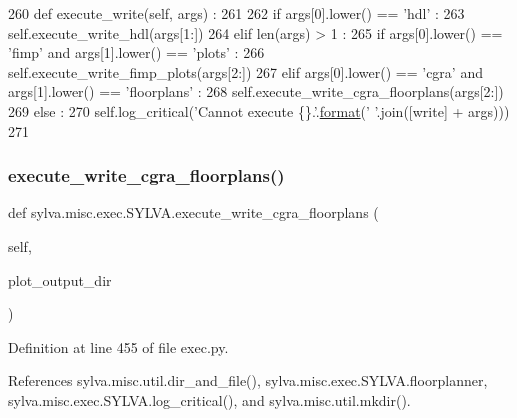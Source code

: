 \begin{DoxyCode}
260   \textcolor{keyword}{def }execute\_write(self, args) :
261 
262     \textcolor{keywordflow}{if} args[0].lower() == \textcolor{stringliteral}{'hdl'} :
263       self.execute\_write\_hdl(args[1:])
264     \textcolor{keywordflow}{elif} len(args) > 1 :
265       \textcolor{keywordflow}{if} args[0].lower() == \textcolor{stringliteral}{'fimp'} \textcolor{keywordflow}{and} args[1].lower() == \textcolor{stringliteral}{'plots'} :
266         self.execute\_write\_fimp\_plots(args[2:])
267       \textcolor{keywordflow}{elif} args[0].lower() == \textcolor{stringliteral}{'cgra'} \textcolor{keywordflow}{and} args[1].lower() == \textcolor{stringliteral}{'floorplans'} :
268         self.execute\_write\_cgra\_floorplans(args[2:])
269     \textcolor{keywordflow}{else} :
270       self.log\_critical(\textcolor{stringliteral}{'Cannot execute \{\}.'}.\hyperlink{namespacesylva_1_1examples_1_1hsdfg_ab3510a0b8457362330aa4d9fd2209590}{format}(\textcolor{stringliteral}{' '}.join([write] + args)))
271 
\end{DoxyCode}
\mbox{\label{classsylva_1_1misc_1_1exec_1_1_s_y_l_v_a_a7de1c85d07263c80c435c01ca33f6f18}} 
\subsubsection{\texorpdfstring{execute\+\_\+write\+\_\+cgra\+\_\+floorplans()}{execute\_write\_cgra\_floorplans()}}
{\footnotesize\ttfamily def sylva.\+misc.\+exec.\+S\+Y\+L\+V\+A.\+execute\+\_\+write\+\_\+cgra\+\_\+floorplans (\begin{DoxyParamCaption}\item[{}]{self,  }\item[{}]{plot\+\_\+output\+\_\+dir }\end{DoxyParamCaption})}



Definition at line 455 of file exec.\+py.



References sylva.\+misc.\+util.\+dir\+\_\+and\+\_\+file(), sylva.\+misc.\+exec.\+S\+Y\+L\+V\+A.\+floorplanner, sylva.\+misc.\+exec.\+S\+Y\+L\+V\+A.\+log\+\_\+critical(), and sylva.\+misc.\+util.\+mkdir().



